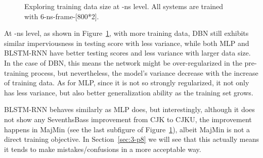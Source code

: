 \begin{figure}[htb]
{
	}
	\caption{Exploring training data size at -ns level. All systems are trained with 6-ns-frame-[800*2].}
	\label{fig:3-ns-data}
\end{figure}

At -ns level, as shown in Figure~\ref{fig:3-ns-data}, with more training data, DBN still exhibits similar imperviousness in testing score with less variance, while both MLP and BLSTM-RNN have better testing scores and less variance with larger data size. In the case of DBN, this means the network might be over-regularized in the pre-training process, but nevertheless, the model's variance decrease with the increase of training data. As for MLP, since it is not so strongly regularized, it not only has less variance, but also better generalization ability as the training set grows.

BLSTM-RNN behaves similarly as MLP does, but interestingly, although it does not show any SeventhsBass improvement from CJK to CJKU, the improvement happens in MajMin (see the last subfigure of Figure~\ref{fig:3-ns-data}), albeit MajMin is not a direct training objective. In Section~\ref{sec:3-p8} we will see that this actually means it tends to make mistakes/confusions in a more acceptable way.


